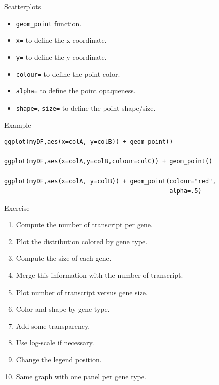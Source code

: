 \documentclass[10pt]{beamer}
\begin{document}
\begin{frame}[fragile]{Scatterplots}
  \begin{block}{}
    \begin{itemize}
    \item \verb!geom_point! function.
    \item \verb!x=! to define the x-coordinate.
    \item \verb!y=! to define the y-coordinate.
      \bigskip
    \item \verb!colour=! to define the point color.
    \item \verb!alpha=! to define the point opaqueness.
    \item \verb!shape=!, \verb!size=! to define the point shape/size.
    \end{itemize}
  \end{block}
  \begin{exampleblock}{Example}
\begin{verbatim}
ggplot(myDF,aes(x=colA, y=colB)) + geom_point()

ggplot(myDF,aes(x=colA,y=colB,colour=colC)) + geom_point()

ggplot(myDF,aes(x=colA, y=colB)) + geom_point(colour="red", 
                                              alpha=.5)
\end{verbatim}
  \end{exampleblock}
\end{frame}


\begin{frame}[fragile]{Exercise}
  \begin{enumerate}
  \item Compute the number of transcript per gene.
  \item Plot the distribution colored by gene type.
    \bigskip
  \item Compute the size of each gene.
  \item Merge this information with the number of transcript.
    \bigskip
  \item Plot number of transcript versus gene size.
  \item Color and shape by gene type.
  \item Add some transparency.
  \item Use log-scale if necessary.
  \item Change the legend position.
    \bigskip
  \item Same graph with one panel per gene type.
  \end{enumerate}
\end{frame}
\end{document}
